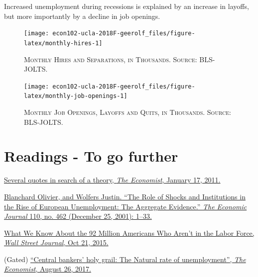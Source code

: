 \documentclass[]{book}
\begin{document}
Increased unemployment during recessions is explained by an increase in
layoffs, but more importantly by a decline in job openings.




\begin{figure}

{\centering \texttt{[image: econ102-ucla-2018F-geerolf\_files/figure-latex/monthly-hires-1]} 

}

\caption{\textsc{Monthly Hires and Separations, in Thousands.
Source: BLS-JOLTS}.}\label{fig:monthly-hires}
\end{figure}




\begin{figure}

{\centering \texttt{[image: econ102-ucla-2018F-geerolf\_files/figure-latex/monthly-job-openings-1]} 

}

\caption{\textsc{Monthly Job Openings, Layoffs and
Quits, in Thousands. Source: BLS-JOLTS}.}\label{fig:monthly-job-openings}
\end{figure}

\section*{Readings - To go further}\label{readings---to-go-further-5}

\href{https://www.economist.com/free-exchange/2011/01/17/several-quotes-in-search-of-a-theory}{Several
quotes in search of a theory, \emph{The Economist}, January 17, 2011.}

\href{https://doi.org/10.1111/1468-0297.00518}{Blanchard Olivier, and
Wolfers Justin. ``The Role of Shocks and Institutions in the Rise of
European Unemployment: The Aggregate Evidence.'' \emph{The Economic
Journal} 110, no. 462 (December 25, 2001): 1--33.}

\href{https://blogs.wsj.com/economics/2015/10/21/what-we-know-about-the-92-million-americans-who-arent-in-the-labor-force/}{What
We Know About the 92 Million Americans Who Aren't in the Labor Force,
\emph{Wall Street Journal}, Oct 21, 2015.}

(Gated)
\href{https://www.economist.com/economics-brief/2017/08/26/the-natural-rate-of-unemployment}{``Central
bankers' holy grail: The Natural rate of unemployment'', \emph{The
Economist}, August 26, 2017.}
\end{document}
